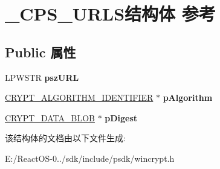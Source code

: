 \hypertarget{struct___c_p_s___u_r_l_s}{}\section{\+\_\+\+C\+P\+S\+\_\+\+U\+R\+L\+S结构体 参考}
\label{struct___c_p_s___u_r_l_s}
\subsection*{Public 属性}
\begin{DoxyCompactItemize}
\item 
\mbox{\label{struct___c_p_s___u_r_l_s_a42c7e3a9d72921968c83d7e41caedfc6}} 
L\+P\+W\+S\+TR {\bfseries psz\+U\+RL}
\item 
\mbox{\label{struct___c_p_s___u_r_l_s_a65742c44371d5cf07b8e25d66972f63d}} 
\hyperlink{struct___c_r_y_p_t___a_l_g_o_r_i_t_h_m___i_d_e_n_t_i_f_i_e_r}{C\+R\+Y\+P\+T\+\_\+\+A\+L\+G\+O\+R\+I\+T\+H\+M\+\_\+\+I\+D\+E\+N\+T\+I\+F\+I\+ER} $\ast$ {\bfseries p\+Algorithm}
\item 
\mbox{\label{struct___c_p_s___u_r_l_s_a37d7c88d70059eba0b9450e85a2aa1f0}} 
\hyperlink{struct___c_r_y_p_t_o_a_p_i___b_l_o_b}{C\+R\+Y\+P\+T\+\_\+\+D\+A\+T\+A\+\_\+\+B\+L\+OB} $\ast$ {\bfseries p\+Digest}
\end{DoxyCompactItemize}


该结构体的文档由以下文件生成\+:\begin{DoxyCompactItemize}
\item 
E\+:/\+React\+O\+S-\/0../sdk/include/psdk/wincrypt.\+h\end{DoxyCompactItemize}
